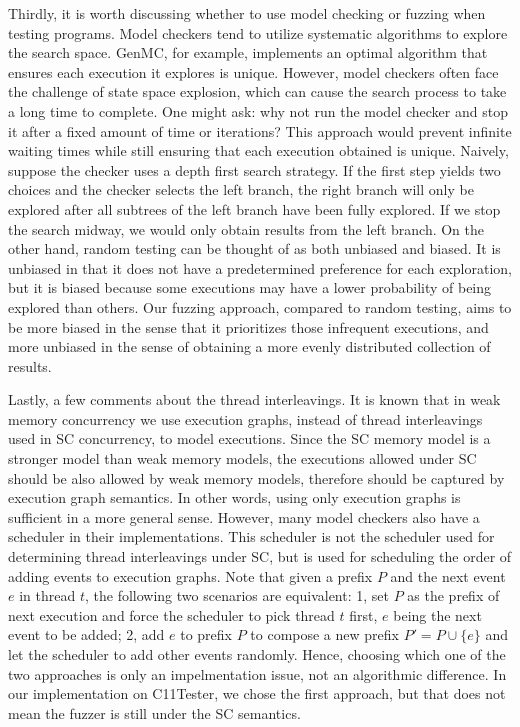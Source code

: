 Thirdly, it is worth discussing whether to use model checking or fuzzing when testing programs. Model checkers tend to utilize systematic algorithms to explore the search space. GenMC, for example, implements an optimal algorithm that ensures each execution it explores is unique. However, model checkers often face the challenge of state space explosion, which can cause the search process to take a long time to complete. One might ask: why not run the model checker and stop it after a fixed amount of time or iterations? This approach would prevent infinite waiting times while still ensuring that each execution obtained is unique.
Naively, suppose the checker uses a depth first search strategy. If the first step yields two choices and the checker selects the left branch, the right branch will only be explored after all subtrees of the left branch have been fully explored. If we stop the search midway, we would only obtain results from the left branch. On the other hand, random testing can be thought of as both unbiased and biased. It is unbiased in that it does not have a predetermined preference for each exploration, but it is biased because some executions may have a lower probability of being explored than others. Our fuzzing approach, compared to random testing, aims to be more biased in the sense that it prioritizes those infrequent executions, and more unbiased in the sense of obtaining a more evenly distributed collection of results.



Lastly, a few comments about the thread interleavings. It is known that in weak memory concurrency we use execution graphs, instead of thread interleavings used in SC concurrency, to model executions. Since the SC memory model is a stronger model than weak memory models, the executions allowed under SC should be also allowed by weak memory models, therefore should be captured by execution graph semantics. In other words, using only execution graphs is sufficient in a more general sense. However, many model checkers also have a scheduler in their implementations. This scheduler is not the scheduler used for determining thread interleavings under SC, but is used for scheduling the order of adding events to execution graphs. Note that given a prefix $P$ and the next event $e$ in thread $t$, the following two scenarios are equivalent: 1, set $P$ as the prefix of next execution and force the scheduler to pick thread $t$ first, $e$ being the next event to be added; 2, add $e$ to prefix $P$ to compose a new prefix $P' = P \cup \{e\}$ and let the scheduler to add other events randomly. Hence, choosing which one of the two approaches is only an impelmentation issue, not an algorithmic difference. In our implementation on C11Tester, we chose the first approach, but that does not mean the fuzzer is still under the SC semantics.


